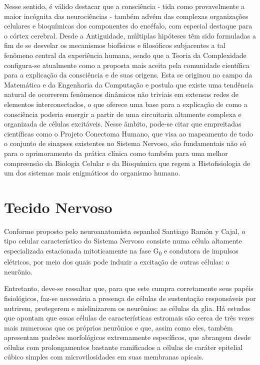 \documentclass[
]{book}
\theoremstyle{definition}
\theoremstyle{definition}
\theoremstyle{definition}
\theoremstyle{definition}
\theoremstyle{remark}
\begin{document}
Nesse sentido, é válido destacar que a consciência - tida como provavelmente a maior incógnita das neurociências - também advém das complexas organizações celulares e bioquímicas dos componentes do encéfalo, com especial destaque para o córtex cerebral. Desde a Antiguidade, múltiplas hipóteses têm sido formuladas a fim de se desvelar os mecanismos biofísicos e filosóficos subjacentes a tal fenômeno central da experiência humana, sendo que a Teoria da Complexidade configura-se atualmente como a proposta mais aceita pela comunidade científica para a explicação da consciência e de suas origens. Esta se originou no campo da Matemática e da Engenharia da Computação e postula que existe uma tendência natural de ocorrerem fenômenos dinâmicos não triviais em extensas redes de elementos interconectados, o que oferece uma base para a explicação de como a consciência poderia emergir a partir de uma circuitaria altamente complexa e organizada de células excitáveis. Nesse âmbito, pode-se citar que empreitadas científicas como o Projeto Conectoma Humano, que visa ao mapeamento de todo o conjunto de sinapses existentes no Sistema Nervoso, são fundamentais não só para o aprimoramento da prática clínica como também para uma melhor compreensão da Biologia Celular e da Bioquímica que regem a Histofisiologia de um dos sistemas mais enigmáticos do organismo humano.

\hypertarget{tecido-nervoso}{%
\section{Tecido Nervoso}\label{tecido-nervoso}}

Conforme proposto pelo neuroanatomista espanhol Santiago Ramón y Cajal, o tipo celular característico do Sistema Nervoso consiste numa célula altamente especializada estacionada mitoticamente na fase G\textsubscript{0} e condutora de impulsos elétricos, por meio dos quais pode induzir a excitação de outras células: o neurônio.

Entretanto, deve-se ressaltar que, para que este cumpra corretamente seus papéis fisiológicos, faz-se necessária a presença de células de sustentação responsáveis por nutrirem, protegerem e mielinizarem os neurônios: as células da glia. Há estudos que apontam que essas células de características estromais são cerca de três vezes mais numerosas que os próprios neurônios e que, assim como eles, também apresentam padrões morfológicos extremamente específicos, que abrangem desde células com prolongamentos bastante ramificados a células de caráter epitelial cúbico simples com microvilosidades em suas membranas apicais.
\end{document}
